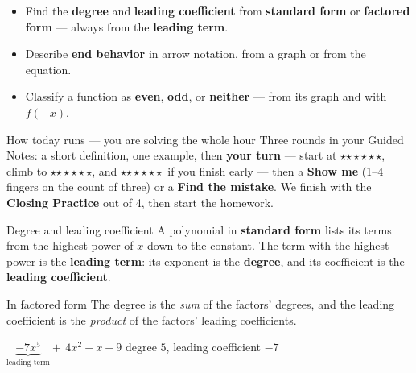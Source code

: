 \documentclass[aspectratio=169, 11pt]{beamer}
\newcommand{\rung}[1]{{\color{goldacc}\ifcase#1\or$\star$\or$\star\star$\or$\star\star\star$\fi}}
\begin{document}
\begin{frame}[t, plain]
  \begin{itemize}\setlength{\itemsep}{3pt}
    \item Find the \textbf{degree} and \textbf{leading coefficient} from \textbf{standard form}
          or \textbf{factored form} --- always from the \textbf{leading term}.
    \item Describe \textbf{end behavior} in arrow notation, from a graph or from the equation.
    \item Classify a function as \textbf{even}, \textbf{odd}, or \textbf{neither} --- from its
          graph and with $f(-x)$.
  \end{itemize}
  \vspace{2pt}
  \begin{block}{How today runs --- you are solving the whole hour}
    Three rounds in your Guided Notes: a short definition, one example, then \textbf{your turn}
    --- start at \rung1, climb to \rung2, and \rung3\ if you finish early --- then a
    \textbf{Show me} (1--4 fingers on the count of three) or a \textbf{Find the mistake}. We
    finish with the \textbf{Closing Practice} out of 4, then start the homework.
  \end{block}
\end{frame}

\begin{frame}[t, plain]
  \begin{block}{Degree and leading coefficient}
    A polynomial in \textbf{standard form} lists its terms from the highest power of $x$ down to
    the constant. The term with the highest power is the \textbf{leading term}: its exponent is
    the \textbf{degree}, and its coefficient is the \textbf{leading coefficient}.
  \end{block}
  \vspace{4pt}
  \begin{block}{In factored form}
    The degree is the \emph{sum} of the factors' degrees, and the leading coefficient is the
    \emph{product} of the factors' leading coefficients.
  \end{block}
  \vspace{4pt}
  \centering
  $\underbrace{-7x^5}_{\text{leading term}}+\,4x^2+x-9$
  \qquad degree $5$, \; leading coefficient $-7$
\end{frame}
\end{document}
